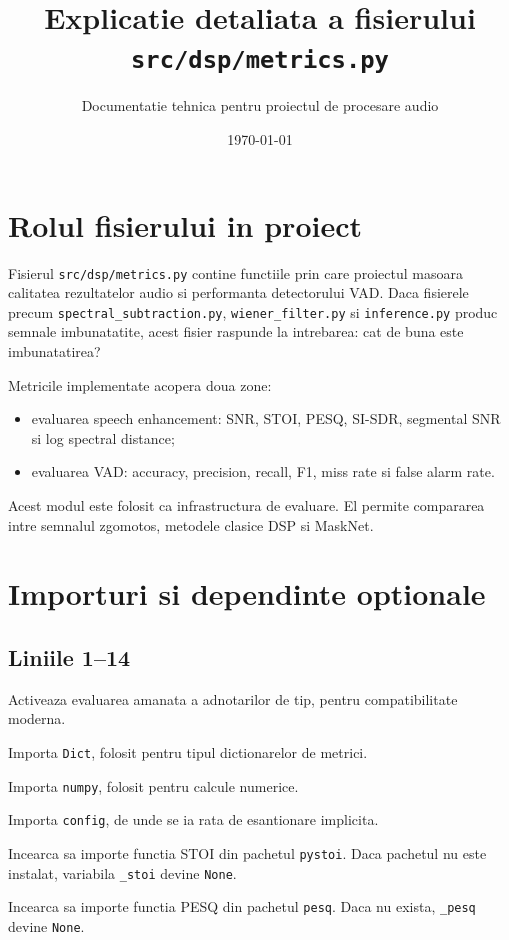 \documentclass[12pt,a4paper]{report}
\title{Explicatie detaliata a fisierului \texttt{src/dsp/metrics.py}}
\author{Documentatie tehnica pentru proiectul de procesare audio}
\date{\today}
\newcommand{\codechunk}[2]{
    
}
\begin{document}
\maketitle
\tableofcontents

\chapter{Rolul fisierului in proiect}

Fisierul \texttt{src/dsp/metrics.py} contine functiile prin care proiectul masoara calitatea rezultatelor audio si performanta detectorului VAD. Daca fisierele precum \texttt{spectral\_subtraction.py}, \texttt{wiener\_filter.py} si \texttt{inference.py} produc semnale imbunatatite, acest fisier raspunde la intrebarea: cat de buna este imbunatatirea?

Metricile implementate acopera doua zone:

\begin{itemize}
    \item evaluarea speech enhancement: SNR, STOI, PESQ, SI-SDR, segmental SNR si log spectral distance;
    \item evaluarea VAD: accuracy, precision, recall, F1, miss rate si false alarm rate.
\end{itemize}

Acest modul este folosit ca infrastructura de evaluare. El permite compararea intre semnalul zgomotos, metodele clasice DSP si MaskNet.

\chapter{Importuri si dependinte optionale}

\section{Liniile 1--14}

\codechunk{1}{14}

\begin{description}[leftmargin=2.9cm,style=nextline]
    \item[Linia 1] Activeaza evaluarea amanata a adnotarilor de tip, pentru compatibilitate moderna.
    \item[Linia 2] Importa \texttt{Dict}, folosit pentru tipul dictionarelor de metrici.
    \item[Linia 3] Importa \texttt{numpy}, folosit pentru calcule numerice.
    \item[Linia 4] Importa \texttt{config}, de unde se ia rata de esantionare implicita.
    \item[Liniile 6--9] Incearca sa importe functia STOI din pachetul \texttt{pystoi}. Daca pachetul nu este instalat, variabila \texttt{\_stoi} devine \texttt{None}.
    \item[Liniile 11--14] Incearca sa importe functia PESQ din pachetul \texttt{pesq}. Daca nu exista, \texttt{\_pesq} devine \texttt{None}.
\end{description}
\end{document}
